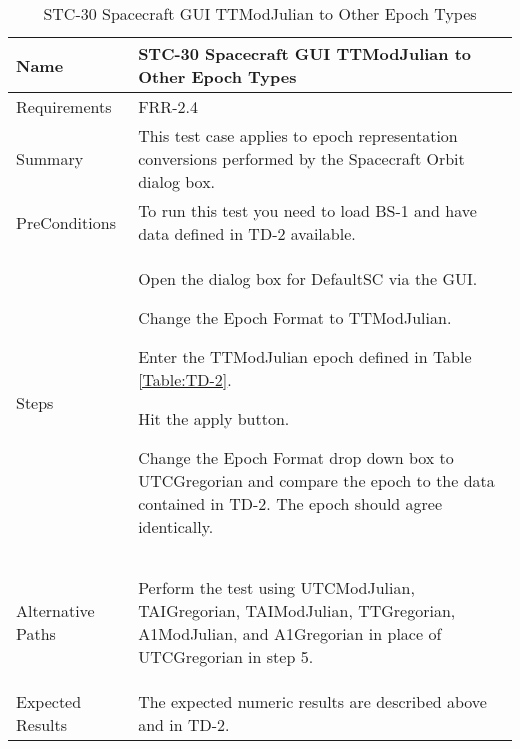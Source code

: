 \begin{table}[htbp!]
\centering
      \begin{tabular}{|p{1.05 in} |p{4.75 in} |}
      \hline
         \rowcolor[rgb]{0.8,0.8,0.8} Name & STC-30 Spacecraft GUI TTModJulian to Other Epoch Types\\
         \hline
         Requirements & FRR-2.4\\ \hline
         Summary &
         This test case applies to epoch representation conversions performed by the Spacecraft Orbit dialog box.  \\
         \hline
         PreConditions & To run this test you need to load BS-1 and have data defined in TD-2 available.\\
         \hline
         Steps &
         \begin{compactenum}
         \item Open the dialog box for DefaultSC via the GUI.
         \item Change the Epoch Format to TTModJulian.
         \item Enter the TTModJulian epoch defined in Table \ref{Table:TD-2}.
         \item Hit the apply button.
         \item Change the Epoch Format drop down box to UTCGregorian and compare the epoch to the
          data contained in TD-2. The epoch should agree identically.
         \end{compactenum}\\
		 \hline
         Alternative Paths &
         \begin{compactenum}
         \item Perform the test using UTCModJulian, TAIGregorian, TAIModJulian, TTGregorian, A1ModJulian,
         and A1Gregorian in place of UTCGregorian in step 5.
         \end{compactenum}\\
         \hline
         Expected Results & The expected numeric results are described above and in TD-2.\\
      \hline
\end{tabular}
      \label{Table:STC-30}
      \caption{STC-30 Spacecraft GUI TTModJulian to Other Epoch Types}
\end{table} 